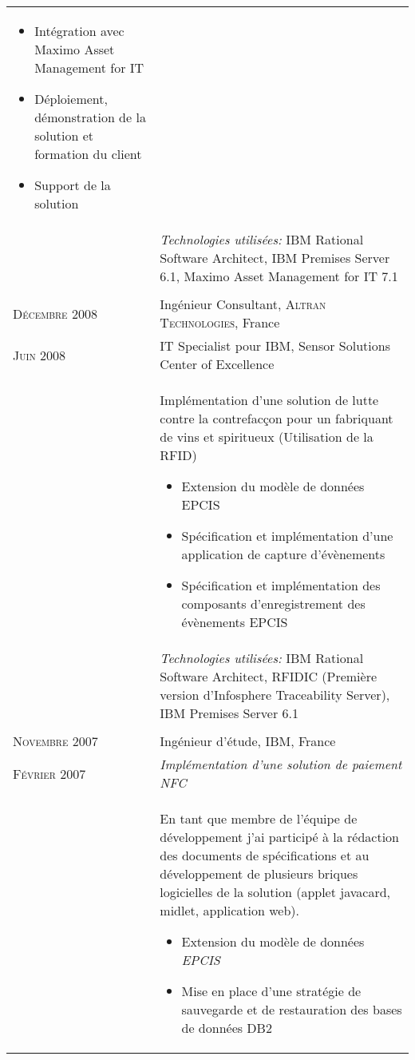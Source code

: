 \begin{longtable}{R{2.5cm}|p{14.8cm}}
{\begin{itemize}
 		  	\item Intégration avec Maximo Asset Management for IT
			\item Déploiement, démonstration de la solution et formation du client
			\item Support de la solution
		\end{itemize}
		\vspace{-1em}
 	}\\&
 \footnotesize{\emph{Technologies utilisées:} IBM Rational Software Architect, IBM Premises Server 6.1, Maximo Asset Management for IT 7.1 }\\ 	
   \\
 	\textsc{Décembre 2008} & Ingénieur Consultant, \textsc{Altran Technologies}, France\\
 	\textsc{Juin 2008}& IT Specialist pour IBM, Sensor Solutions Center of Excellence\\&
 	\footnotesize{
 	 	Implémentation d'une solution de lutte contre la contrefacçon pour un fabriquant de vins et spiritueux (Utilisation de la RFID)
 		\begin{itemize}
 		  	\item Extension du modèle de données EPCIS
 		  	\item Spécification et implémentation d'une application de capture d'évènements
 		  	\item Spécification et implémentation des  composants d'enregistrement des évènements EPCIS
		\end{itemize}
		\vspace{-1em}
 	}\\&
 \footnotesize{\emph{Technologies utilisées:} IBM Rational Software Architect, RFIDIC (Première version d'Infosphere Traceability Server), IBM Premises Server 6.1 }\\
 \\
 	\textsc{Novembre 2007} & Ingénieur d'étude, \textsc{IBM}, France \\
 	\textsc{Février 2007}&\emph{Implémentation d'une solution de paiement NFC}\\&
 	\footnotesize{
 	 	En tant que membre de l'équipe de développement j'ai
 		participé à la rédaction des documents de spécifications et au développement de
 		plusieurs briques logicielles de la solution (applet javacard, midlet,
 		application web).
 	 	\begin{itemize}
			\item Extension du modèle de données \emph{EPCIS}
			\item Mise en place d'une stratégie de sauvegarde et de restauration des bases de données DB2

\end{itemize}}
\end{longtable}
